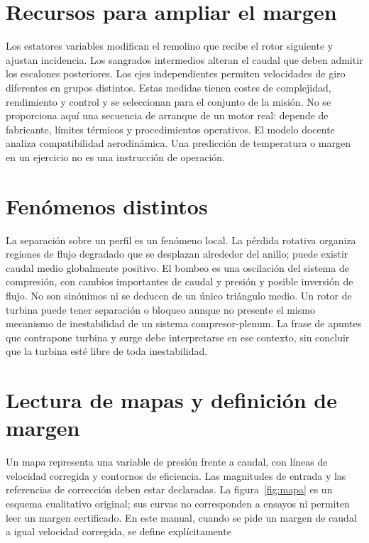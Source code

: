 \documentclass[10pt,openany]{book}
\begin{document}
\section{Recursos para ampliar el margen}

Los estatores variables modifican el remolino que recibe el rotor siguiente y ajustan incidencia. Los sangrados intermedios alteran el caudal que deben admitir los escalones posteriores. Los ejes independientes permiten velocidades de giro diferentes en grupos distintos. Estas medidas tienen costes de complejidad, rendimiento y control y se seleccionan para el conjunto de la misión.
No se proporciona aquí una secuencia de arranque de un motor real: depende de fabricante, límites térmicos y procedimientos operativos. El modelo docente analiza compatibilidad aerodinámica. Una predicción de temperatura o margen en un ejercicio no es una instrucción de operación.

\section{Fenómenos distintos}

La separación sobre un perfil es un fenómeno local. La pérdida rotativa organiza regiones de flujo degradado que se desplazan alrededor del anillo; puede existir caudal medio globalmente positivo. El bombeo es una oscilación del sistema de compresión, con cambios importantes de caudal y presión y posible inversión de flujo. No son sinónimos ni se deducen de un único triángulo medio.
Un rotor de turbina puede tener separación o bloqueo aunque no presente el mismo mecanismo de inestabilidad de un sistema compresor-plenum. La frase de apuntes que contrapone turbina y surge debe interpretarse en ese contexto, sin concluir que la turbina esté libre de toda inestabilidad.

\section{Lectura de mapas y definición de margen}

Un mapa representa una variable de presión frente a caudal, con líneas de velocidad corregida y contornos de eficiencia. Las magnitudes de entrada y las referencias de corrección deben estar declaradas. La figura~\ref{fig:mapa} es un esquema cualitativo original; sus curvas no corresponden a ensayos ni permiten leer un margen certificado.
En este manual, cuando se pide un margen de caudal a igual velocidad corregida, se define explícitamente
\end{document}
